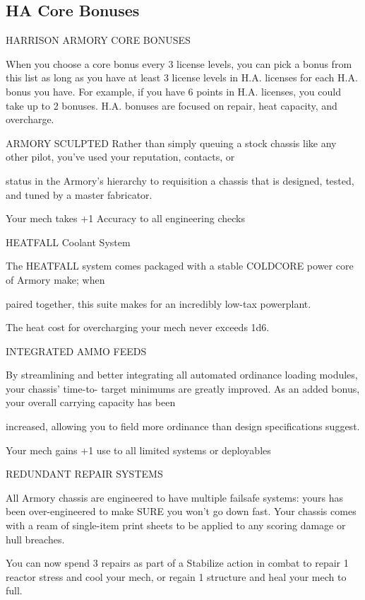 \subsection{HA Core Bonuses}

                           HARRISON ARMORY CORE BONUSES

When you choose a core bonus every 3 license levels, you can pick a bonus from this list as long
as you have at least 3 license levels in H.A. licenses for each H.A. bonus you have. For example,
if you have 6 points in H.A. licenses, you could take up to 2 bonuses. H.A. bonuses are focused
on repair, heat capacity, and overcharge.


ARMORY SCULPTED
Rather than simply queuing a stock chassis like any other pilot, you’ve used your reputation, contacts, or

status in the Armory’s hierarchy to requisition a chassis that is designed, tested, and tuned by a master
fabricator.

Your mech takes +1 Accuracy to all engineering checks


HEATFALL Coolant System

The HEATFALL system comes packaged with a stable COLDCORE power core of Armory make; when

paired together, this suite makes for an incredibly low-tax powerplant.

The heat cost for overcharging your mech never exceeds 1d6.


INTEGRATED AMMO FEEDS

By streamlining and better integrating all automated ordinance loading modules, your chassis’ time-to-
target minimums are greatly improved. As an added bonus, your overall carrying capacity has been

increased, allowing you to field more ordinance than design specifications suggest.

Your mech gains +1 use to all limited systems or deployables


REDUNDANT REPAIR SYSTEMS

All Armory chassis are engineered to have multiple failsafe systems: yours has been over-engineered to
make SURE you won’t go down fast. Your chassis comes with a ream of single-item print sheets to be
applied to any scoring damage or hull breaches.

You can now spend 3 repairs as part of a Stabilize action in combat to repair 1 reactor stress and
cool your mech, or regain 1 structure and heal your mech to full.


